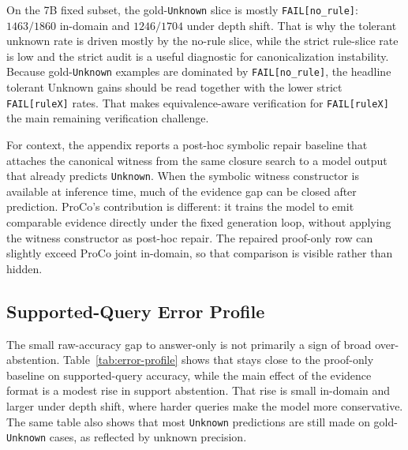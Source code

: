 On the 7B fixed subset, the gold-\texttt{Unknown} slice is mostly
\texttt{FAIL[no\_rule]}: \(1463/1860\) in-domain and \(1246/1704\) under depth
shift. That is why the tolerant unknown rate is driven mostly by the
no-rule slice, while the strict rule-slice rate is low and the strict audit is a
useful diagnostic for canonicalization instability. Because gold-\texttt{Unknown}
examples are dominated by \texttt{FAIL[no\_rule]}, the headline tolerant
Unknown gains should be read together with the lower strict
\texttt{FAIL[ruleX]} rates. That makes equivalence-aware verification for
\texttt{FAIL[ruleX]} the main remaining verification challenge.

For context, the appendix reports a post-hoc symbolic repair baseline that
attaches the canonical witness from the same closure search to a model output
that already predicts \texttt{Unknown}. When the symbolic witness constructor
is available at inference time, much of the evidence gap can be closed after
prediction. ProCo's contribution is different: it trains the model to emit
comparable evidence directly under the fixed generation loop, without applying
the witness constructor as post-hoc repair. The repaired proof-only row can
slightly exceed ProCo joint in-domain, so that comparison is visible rather
than hidden.

\begin{table}[t]
\centering
\small

\caption{Strict audit of gold-\texttt{Unknown} examples. Verifier-accepted is
the main tolerant unknown-evidence rate. Strict requires exact match to the
canonical failure tag and witness. Rows report 3-seed means.}
\label{tab:abstention-audit}
\end{table}

\subsection{Supported-Query Error Profile}

The small raw-accuracy gap to answer-only is not primarily a sign of broad
over-abstention. Table~\ref{tab:error-profile} shows that \model{} stays close
to the proof-only baseline on supported-query accuracy, while the main effect
of the evidence format is a modest rise in support abstention. That rise is
small in-domain and larger under depth shift, where harder queries make the
model more conservative. The same table also shows that most
\texttt{Unknown} predictions are still made on gold-\texttt{Unknown} cases, as
reflected by unknown precision.

